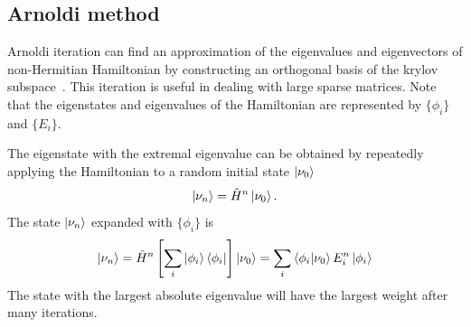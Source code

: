 \documentclass[longbibliography, aps, prx, amsmath, amssymb, amsfonts, twocolumn,superscriptaddress, footinbib]{revtex4-1}
\begin{document}
	\subsection{Arnoldi method}

	Arnoldi iteration can find an approximation of the eigenvalues and eigenvectors of non-Hermitian Hamiltonian by constructing an orthogonal basis of the krylov subspace~\cite{arnoldi1951principle}. This iteration is useful in dealing with large sparse matrices. Note that the eigenstates and eigenvalues of the Hamiltonian are represented by $\{\phi_i \}$ and $\{E_i\}$.

	The eigenstate with the extremal eigenvalue can be obtained by repeatedly applying the Hamiltonian to a random initial state $\ket{\nu_0}$
	\begin{equation}
		\ket{\nu_n} = \hat{H}^n \ket{\nu_0}.
	\end{equation}
	The state $\ket{\nu_n}$ expanded with $\{\phi_i \}$ is 
	\begin{equation}
		\ket{\nu_n} = \hat{H}^n \left[ \sum_i \ket{\phi_i} \bra{\phi_i}\right] \ket{\nu_0} = \sum_i \bra{\phi_i} \ket{\nu_0} E_i^n\ket{\phi_i}
	\end{equation}
	The state with the largest absolute eigenvalue will have the largest weight after many iterations. 
\end{document}
